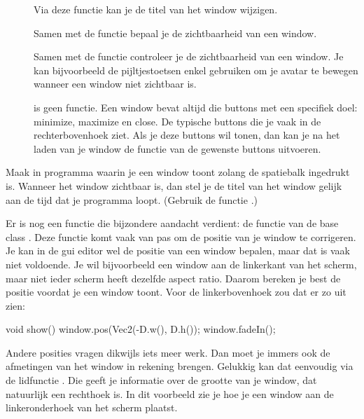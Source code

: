 \begin{description}
	\item[] Via deze functie kan je de titel van het window wijzigen.
	\item[] Samen met de functie  bepaal je de zichtbaarheid van een window.
	\item[] Samen met de functie  controleer je de zichtbaarheid van een window. Je kan bijvoorbeeld de pijltjestoetsen enkel gebruiken om je avatar te bewegen wanneer een window niet zichtbaar is.
	\item[] is geen functie. Een window bevat altijd die buttons met een specifiek doel: minimize, maximize en close. De typische buttons die je vaak in de rechterbovenhoek ziet. Als je deze buttons wil tonen, dan kan je na het laden van je window de  functie van de gewenste buttons uitvoeren.
\end{description}

\begin{exercise}
Maak in programma waarin je een window toont zolang de spatiebalk ingedrukt is. Wanneer het window zichtbaar is, dan stel je de titel van het window gelijk aan de tijd dat je programma loopt. (Gebruik de functie .)
\end{exercise}

Er is nog een functie die bijzondere aandacht verdient: de functie  van de base class . Deze functie komt vaak van pas om de positie van je window te corrigeren. Je kan in de gui editor wel de positie van een window bepalen, maar dat is vaak niet voldoende. Je wil bijvoorbeeld een window aan de linkerkant van het scherm, maar niet ieder scherm heeft dezelfde aspect ratio. Daarom bereken je best de positie voordat je een window toont. Voor de linkerbovenhoek zou dat er zo uit zien:

\begin{code}
void show() {
   window.pos(Vec2(-D.w(), D.h());
	 window.fadeIn();
}
\end{code}

Andere posities vragen dikwijls iets meer werk. Dan moet je immers ook de afmetingen van het window in rekening brengen. Gelukkig kan dat eenvoudig via de lidfunctie . Die geeft je informatie over de grootte van je window, dat natuurlijk een rechthoek is. In dit voorbeeld zie je hoe je een window aan de linkeronderhoek van het scherm plaatst. 

